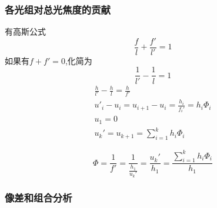 \subsubsection{各光组对总光焦度的贡献}
有高斯公式
\begin{equation}
    \frac{f}{l}+\frac{f'}{l'}=1 \tag{2.3.17}
\end{equation}
如果有$f+f'=0$,化简为
\begin{equation}
    \frac{1}{l'}-\frac{1}{l}=1 \tag{2.3.18}
\end{equation}
\begin{align}
    \frac{h}{l'}-\frac{h}{l}=\frac{h}{f'} \tag{2.3.19.a}
    \\
    u'_{i}-u_{i}=u_{i+1}-u_{i}=\frac{h_i}{f_i'}=h_i\Phi_i\tag{2.3.19.b}\\
    u_1=0 \tag{2.3.19.c}\\
    u_k'=u_{k+1}=\sum_{i=1}^k{h_i\Phi_i}\tag{2.3.19}
\end{align}

\begin{equation}
\Phi=\frac{1}{f'}=\frac{1}{\frac{h_1}{u_k'}}=\frac{u_k'}{h_1}=\frac{\sum_{i=1}^k{h_i\Phi_i}}{h_1}\tag{2.3.20}
\end{equation}
\subsubsection{像差和组合分析}

